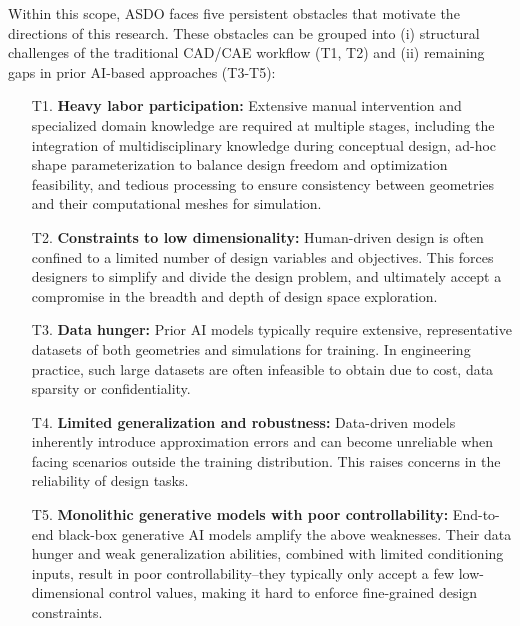 Within this scope, ASDO faces five persistent obstacles that motivate the directions of this research. These obstacles can be grouped into (i) structural challenges of the traditional CAD/CAE workflow (T1, T2) and (ii) remaining gaps in prior AI-based approaches (T3-T5):
\begin{itemize}
    \item[T1.] \textbf{Heavy labor participation:} Extensive manual intervention and specialized domain knowledge are required at multiple stages, including the integration of multidisciplinary knowledge during conceptual design, ad-hoc shape parameterization to balance design freedom and optimization feasibility, and tedious processing to ensure consistency between geometries and their computational meshes for simulation.
    \item[T2.] \textbf{Constraints to low dimensionality:} Human-driven design is often confined to a limited number of design variables and objectives. This forces designers to simplify and divide the design problem, and ultimately accept a compromise in the breadth and depth of design space exploration.
    \item[T3.] \textbf{Data hunger:} Prior AI models typically require extensive, representative datasets of both geometries and simulations for training. In engineering practice, such large datasets are often infeasible to obtain due to cost, data sparsity or confidentiality.
    \item[T4.] \textbf{Limited generalization and robustness:} Data-driven models inherently introduce approximation errors and can become unreliable when facing scenarios outside the training distribution. This raises concerns in the reliability of design tasks.
    \item[T5.] \textbf{Monolithic generative models with poor controllability:} End-to-end black-box generative AI models amplify the above weaknesses. Their data hunger and weak generalization abilities, combined with limited conditioning inputs, result in poor controllability--they typically only accept a few low-dimensional control values, making it hard to enforce fine-grained design constraints.
\end{itemize}

